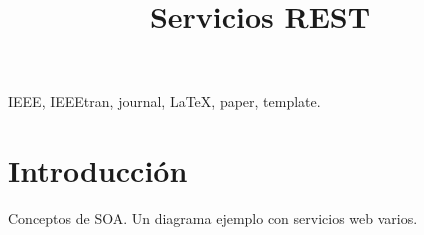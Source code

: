 \documentclass[conference]{IEEEtran}
\begin{document}
%
\title{Servicios REST}


\author{
}



\maketitle


\begin{abstract}
  \lipsum[1]
\end{abstract}

\begin{IEEEkeywords}
IEEE, IEEEtran, journal, \LaTeX, paper, template.
\end{IEEEkeywords}



%
\IEEEpeerreviewmaketitle

\section{Introducción}

Conceptos de SOA. Un diagrama ejemplo con servicios web varios.
\end{document}
